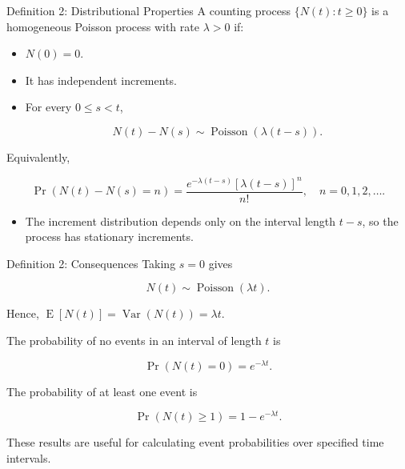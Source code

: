\documentclass[
  ignorenonframetext,
  aspectratio=169,
]{beamer}
\providecommand{\tightlist}{%
  \setlength{\itemsep}{0pt}\setlength{\parskip}{0pt}}
\begin{document}
\begin{frame}{Definition 2: Distributional Properties}
\protect{}\label{definition-2-distributional-properties}
A counting process \(\{N(t):t\geq0\}\) is a homogeneous Poisson process
with rate \(\lambda>0\) if:

\begin{itemize}
\item
  \(N(0)=0\).
\item
  It has independent increments.
\item
  For every \(0\leq s<t\),

  \[
  N(t)-N(s)\sim\operatorname{Poisson}(\lambda(t-s)).
  \]
\end{itemize}

Equivalently,

\[
\Pr(N(t)-N(s)=n)
=\frac{e^{-\lambda(t-s)}[\lambda(t-s)]^n}{n!},
\quad n=0,1,2,\ldots.
\]

\begin{itemize}
\tightlist
\item
  The increment distribution depends only on the interval length
  \(t-s\), so the process has stationary increments.
\end{itemize}
\end{frame}

\begin{frame}{Definition 2: Consequences}
\protect{}\label{definition-2-consequences}
Taking \(s=0\) gives

\[
N(t)\sim\operatorname{Poisson}(\lambda t).
\]

Hence, \(\operatorname{E}[N(t)]=\operatorname{Var}(N(t))=\lambda t.\)

The probability of no events in an interval of length \(t\) is

\[
\Pr(N(t)=0)=e^{-\lambda t}.
\]

The probability of at least one event is

\[
\Pr(N(t)\geq1)=1-e^{-\lambda t}.
\]

These results are useful for calculating event probabilities over
specified time intervals.
\end{frame}
\end{document}
